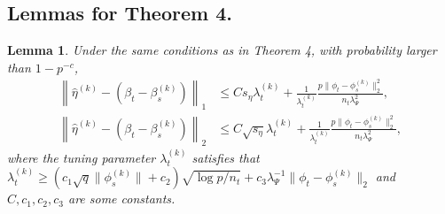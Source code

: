 \documentclass[12pt]{article}
\newtheorem{lemma}{Lemma}
\begin{document}
\subsection{Lemmas for Theorem 4. }
\begin{lemma}
    \label{lem:l1_bound_etak}
    Under the same conditions as in Theorem 4, with probability larger than $1-p^{-c}$, 
    \begin{align*}
        \left\|\hat{\eta}^{(k)} - \left(\beta_t - \beta_s^{(k)}\right)\right\|_1 &\le
         C s_\eta\lambda_t^{(k)} +\frac{1}{\lambda_t^{(k)}}\frac{p\|\phi_t - \phi_s^{(k)}\|^2_2}{n_t\lambda_\Psi^2},\\
         \left\|\hat{\eta}^{(k)} - \left(\beta_t - \beta_s^{(k)}\right)\right\|_2 &\le
         C \sqrt{s_\eta}\lambda_t^{(k)} +\frac{1}{\lambda_t^{(k)}}\frac{p\|\phi_t - \phi_s^{(k)}\|^2_2}{n_t\lambda_\Psi^2},
    \end{align*}
    where the tuning parameter $\lambda_t^{(k)}$ satisfies that $\lambda_t^{(k)} \ge (c_1\sqrt{q}\|\phi_s^{(k)}\|+c_2)\sqrt{\log p/n_t}+c_3\lambda_\Psi^{-1}\|\phi_t-\phi_s^{(k)}\|_2$ and $C,c_1,c_2,c_3$ are some constants. 
\end{lemma}
\end{document}
